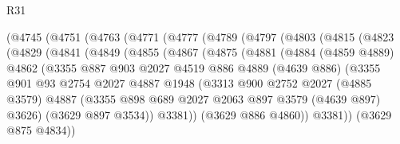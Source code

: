 \begin{lexlean}{R31}
\begin{coremodule}
        (@4745
          (@4751
            (@4763
              (@4771
                (@4777
                  (@4789
                    (@4797
                      (@4803
                        (@4815
                          (@4823
                            (@4829
                              (@4841
                                (@4849
                                  (@4855
                                    (@4867
                                      (@4875
                                        (@4881
                                          (@4884
                                            (@4859 @4889)
                                            @4862
                                            (@3355
                                              @887
                                              @903
                                              @2027
                                              @4519
                                              @886
                                              @4889
                                              (@4639 @886)
                                              (@3355
                                                @901
                                                @93
                                                @2754
                                                @2027
                                                @4887
                                                @1948
                                                (@3313
                                                  @900
                                                  @2752
                                                  @2027
                                                  (@4885 @3579)
                                                  @4887
                                                  (@3355
                                                    @898
                                                    @689
                                                    @2027
                                                    @2063
                                                    @897
                                                    @3579
                                                    (@4639 @897)
                                                    @3626)
                                                  (@3629 @897 @3534))
                                                @3381))
                                            (@3629 @886 @4860))
                                          @3381))
                                      (@3629 @875 @4834))

\end{coremodule}
\end{lexlean}
